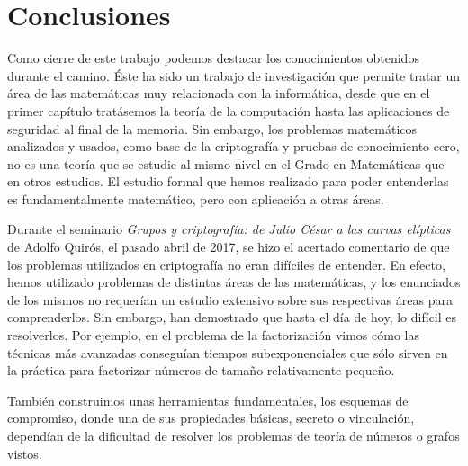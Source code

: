 










\clearpage

\section*{Conclusiones}

Como cierre de este trabajo podemos destacar los conocimientos obtenidos durante el camino. Éste ha sido un trabajo de investigación que permite tratar un área de las matemáticas muy relacionada con la informática, desde que en el primer capítulo tratásemos la teoría de la computación hasta las aplicaciones de seguridad al final de la memoria. Sin embargo, los problemas matemáticos analizados y usados, como base de la criptografía y pruebas de conocimiento cero, no es una teoría que se estudie al mismo nivel en el Grado en Matemáticas que en otros estudios. El estudio formal que hemos realizado para poder entenderlas es fundamentalmente matemático, pero con aplicación a otras áreas.
 
 
Durante el seminario \textit{Grupos y criptograf\'ia: de Julio C\'esar a las curvas el\'ipticas} de Adolfo Quirós, el pasado abril de 2017, se hizo el acertado comentario de que los problemas utilizados en criptografía no eran difíciles de entender. En efecto, hemos utilizado problemas de distintas áreas de las matemáticas, y los enunciados de los mismos no requerían un estudio extensivo sobre sus respectivas áreas para comprenderlos. Sin embargo, han demostrado que hasta el día de hoy, lo difícil es resolverlos. Por ejemplo, en el problema de la factorización vimos cómo las técnicas más avanzadas conseguían tiempos subexponenciales que sólo sirven en la práctica para factorizar números de tamaño relativamente pequeño.

También construimos unas herramientas fundamentales, los esquemas de compromiso, donde una de sus propiedades básicas, secreto o vinculación, dependían de la dificultad de resolver los problemas de teoría de números o grafos vistos.

